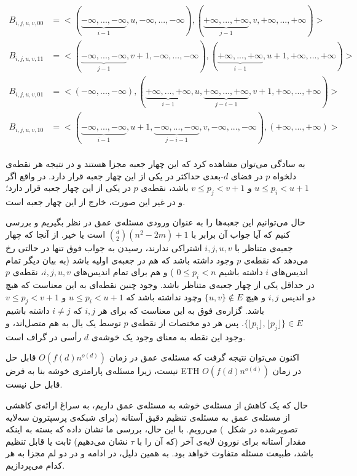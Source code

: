 \begin{align*}
	B_{i,j,u,v,00} &= <(\underset{i-1}{\underbrace{-\infty, ..., -\infty}}, u, -\infty, ..., -\infty), (\underset{j-1}{\underbrace{+\infty, ..., +\infty}}, v, +\infty, ..., +\infty)>\\
	B_{i,j,u,v,11} &= <(\underset{j-1}{\underbrace{-\infty, ..., -\infty}}, v+1, -\infty, ..., -\infty), (\underset{i-1}{\underbrace{+\infty, ..., +\infty}}, u+1, +\infty, ..., +\infty)>\\
	B_{i,j,u,v,01} &= <(-\infty, ..., -\infty), (\underset{i-1}{\underbrace{+\infty, ..., +\infty}}, u, \underset{j-i-1}{\underbrace{+\infty, ..., +\infty}}, v+1, +\infty, ..., +\infty)>\\
	B_{i,j,u,v,10} &= <(\underset{i-1}{\underbrace{-\infty, ..., -\infty}}, u+1, \underset{j-i-1}{\underbrace{-\infty, ..., -\infty}}, v, -\infty, ..., -\infty),(+\infty, ..., +\infty)>\\
\end{align*}

به سادگی می‌توان مشاهده کرد که این چهار جعبه مجزا هستند و در نتیجه هر نقطه‌ی دلخواه $p$ در فضای $d$-بعدی حداکثر در یکی از این چهار جعبه قرار دارد. در واقع اگر
$u \le p_i < u + 1$ و $v  \le p_j < v+1$
باشد، نقطه‌ی $p$ در یکی از این چهار جعبه قرار دارد؛ و در غیر این صورت، خارج از این چهار جعبه است.

حال می‌توانیم این جعبه‌ها را به عنوان ورودی مسئله‌ی عمق در نظر بگیریم و بررسی کنیم که آیا جواب آن برابر با
$\binom{d}{2}(n^2 - 2m) + 1$
است یا خیر. از آنجا که چهار جعبه‌ی متناظر با $i,j,u,v$ اشتراکی ندارند، رسیدن به جواب فوق تنها در حالتی رخ می‌دهد که نقطه‌ی $p$ وجود داشته باشد که هم در جعبه‌ی اولیه باشد (به بیان دیگر تمام اندیس‌های $i$ داشته باشیم 
$0 \le p_i < n$
) و هم برای تمام اندیس‌های $i,j,u,v$، نقطه‌ی $p$ در حداقل یکی از چهار جعبه‌ی متناظر باشد. وجود چنین نقطه‌ای به این معناست که هیچ دو اندیس $i, j$ و هیچ $\{u,v\} \notin E$ وچود نداشته باشد که
$u \le p_i < u + 1$ و $v  \le p_j < v+1$
باشد. گزاره‌ی فوق به این معناست که برای هر $i, j$ که
$i \neq j$
داشته باشیم
$\{\lfloor p_i \rfloor, \lfloor p_j \rfloor\} \in E$.
پس هر دو مختصات از نقطه‌ی $p$ توسط یک یال به هم متصل‌اند، و وجود این نقطه به معنای وجود یک خوشه‌ی $d$ رأسی در گراف است.


اکنون می‌توان نتیجه گرفت که مسئله‌ی عمق در زمان $O(f(d) n^{o(d)})$ قابل حل نیست، زیرا مسئله‌ی پارامتری خوشه بنا به فرض ETH در زمان $O(f(d) n^{o(d)})$ قابل حل نیست.

حال که یک کاهش از مسئله‌ی خوشه به مسئله‌ی عمق داریم، به سراغ ارائه‌ی کاهشی از مسئله‌ی عمق به مسئله‌ی تنظیم دقیق آستانه (برای شبکه‌ی پرسپترون سه‌لایه تصویرشده در شکل~) می‌رویم. با این حال، بررسی ما نشان داده که بسته به اینکه مقدار آستانه برای نورون لایه‌ی آخر (که آن را با $\tau$ نشان می‌دهیم) ثابت یا قابل تنظیم باشد، طبیعت مسئله متفاوت خواهد بود. به همین دلیل، در ادامه و در دو لم مجزا به هر کدام می‌پردازیم.


